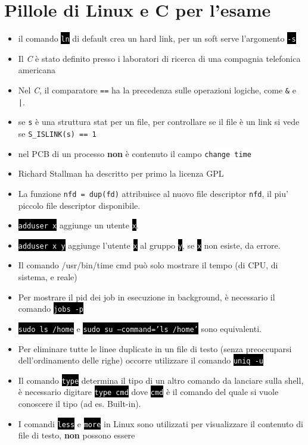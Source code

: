 \documentclass[12pt, letterpaper]{article}
\newcommand{\code}[1]{\colorbox{light-gray}{\texttt{#1}}}
\newcommand{\shelll}[1]{\colorbox{black}{\textcolor{white}{\texttt{#1}}}}
\newcommand{\codee}[1]{\colorbox{white}{\texttt{#1}}}
\begin{document}
\section{Pillole di Linux e C per l'esame}
\begin{itemize}
    \item il comando \shelll{ln} di default crea un hard link, per un soft serve l'argomento \shelll{-s}
    \item Il \textit{C} è stato definito  presso i laboratori di ricerca di una compagnia telefonica americana
    \item Nel \textit{C}, il comparatore \code{==} ha la precedenza sulle operazioni logiche, come \code{\&} e \code{|}.
    \item se \code{s} è una struttura stat per un file, per controllare se il file  è un link si vede se \code{S\_ISLINK(s) == 1}
    \item nel PCB di un processo \textbf{non} è contenuto il campo \codee{change time}  
    \item Richard Stallman ha descritto per primo la licenza GPL
    \item La funzione \code{nfd = dup(fd)} attribuisce al nuovo file descriptor \code{nfd}, il piu' piccolo file descriptor disponibile.
    \item  \shelll{adduser x} aggiunge un utente \shelll{x}.
    \item \shelll{adduser x y} aggiunge l'utente \shelll{x} al gruppo \shelll{y}, se \shelll{x} non esiste, da errore.
    \item Il comando /usr/bin/time cmd può solo mostrare il tempo (di CPU, di sistema, e reale)
    \item Per mostrare il pid dei job in esecuzione in background, è necessario il comando \shelll{jobs -p}
    \item \shelll{sudo ls  /home} e \shelll{sudo su --command='ls /home'} sono equivalenti.
    \item Per eliminare tutte le linee duplicate in un file di testo (senza preoccuparsi dell'ordinamento delle righe) occorre
    utilizzare il comando \shelll{uniq -u}
    \item Il comando \shelll{type} determina il tipo di un altro comando da lanciare sulla shell, è necessario digitare \shelll{type cmd}
    dove \shelll{cmd} è il comando del quale si vuole conoscere il tipo (ad es. Built-in).
    \item I comandi \shelll{less} e \shelll{more} in Linux sono utilizzati per visualizzare il contenuto di file di testo, \textbf{non} possono essere 

\end{itemize}
\end{document}
